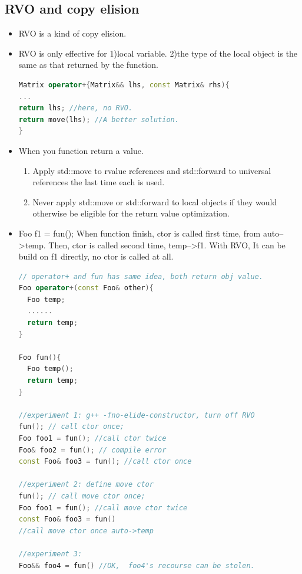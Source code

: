 \documentclass[a4paper,12pt,twoside]{book}
\begin{document}
\subsection{RVO and copy elision}
\begin{itemize}
\item RVO is a kind of copy elision.
		\item RVO is only effective for 1)local variable. 2)the type of the local object is the same as that returned by the function.

\begin{lstlisting}[frame=single, language=c++]
Matrix operator+{Matrix&& lhs, const Matrix& rhs){
...
return lhs; //here, no RVO.
return move(lhs); //A better solution.
}
\end{lstlisting}

\item When you function return a value.

\begin{enumerate}
\item Apply std::move to rvalue references and std::forward to universal references
the last time each is used.

\item Never apply std::move or std::forward to local objects if they would otherwise
be eligible for the return value optimization.
\end{enumerate}

\item Foo f1 = fun(); When function finish, ctor is called first time, from auto-->temp. Then, ctor is called  second time,  temp-->f1. With RVO, It can be build on f1 directly, no ctor is called at all.
\begin{lstlisting}[frame=single, language=c++]
// operator+ and fun has same idea, both return obj value.
Foo operator+(const Foo& other){
  Foo temp;
  ......
  return temp;
}

Foo fun(){
  Foo temp();
  return temp;
}

//experiment 1: g++ -fno-elide-constructor, turn off RVO
fun(); // call ctor once;
Foo foo1 = fun(); //call ctor twice
Foo& foo2 = fun(); // compile error
const Foo& foo3 = fun(); //call ctor once

//experiment 2: define move ctor
fun(); // call move ctor once;
Foo foo1 = fun(); //call move ctor twice
const Foo& foo3 = fun()
//call move ctor once auto->temp

//experiment 3:
Foo&& foo4 = fun() //OK,  foo4's recourse can be stolen.


\end{lstlisting}
\end{itemize}
\end{document}
